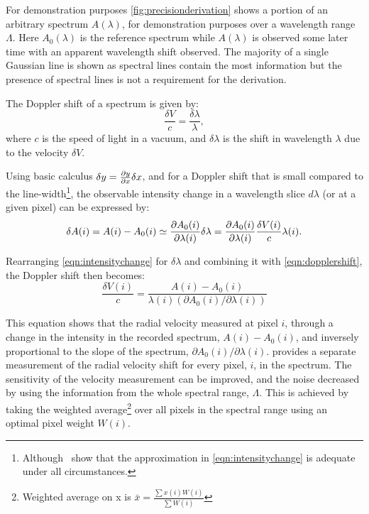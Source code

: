 For demonstration purposes \cref{fig:precisionderivation} shows a portion of an arbitrary spectrum \(A(\lambda)\), for demonstration purposes over a wavelength range \(\Lambda\).
Here \({A}_{0}(\lambda)\) is the reference spectrum while \(A(\lambda)\) is observed some later time with an apparent wavelength shift observed.
The majority of a single Gaussian line is shown as spectral lines contain the most information but the presence of spectral lines is not a requirement for the derivation.

The Doppler shift of a spectrum is given by:
\begin{equation}
\frac{\delta V}{c} = \frac{\delta \lambda}{\lambda},
\label{eqn:dopplershift}
\end{equation}
where \(c\) is the speed of light in a vacuum, and \(\delta \lambda\) is the shift in wavelength \(\lambda\) due to the velocity \(\delta V\).


Using basic calculus \(\delta y = \frac{\partial{y}}{\partial{x}} \delta x \nonumber\), and for a Doppler shift that is small compared to the line-width\footnote{Although~\citet{connes_absolute_1985} show that the approximation in \cref{eqn:intensitychange} is adequate under all circumstances.}, the observable intensity change in a wavelength slice \(d \lambda\) (or at a given pixel) can be expressed by:
\begin{equation}
\delta A(i) = A(i) - {A}_{0}(i) \simeq \frac{\partial{{A}_{0}(i)}}{\partial{\lambda(i)}} \delta \lambda = \frac{\partial{{A}_{0}(i)}}{\partial{\lambda(i)}} \frac{\delta V(i)}{c}\lambda(i).
\label{eqn:intensitychange}
\end{equation}

Rearranging \cref{eqn:intensitychange} for \(\delta \lambda\) and combining it with \cref{eqn:dopplershift}, the Doppler shift then becomes:
\begin{equation}
    \frac{\delta V(i)}{c} = \frac{A(i) - {A}_{0}(i) }{\lambda(i) (\partial {A}_{0}(i)/\partial \lambda(i))} \label{eqn:delta_v_i}
\end{equation}

This equation shows that the radial velocity measured at pixel {\(i\)}, through a change in the intensity in the recorded spectrum, \(A(i)-{A}_{0}(i)\), and inversely proportional to the slope of the spectrum, \({\partial {A}_{0}(i)}/{\partial \lambda(i)}\).
 provides a separate measurement of the radial velocity shift for every pixel, \(i\), in the spectrum.
The sensitivity of the velocity measurement can be improved, and the noise decreased by using the information from the whole spectral range, \(\Lambda\).
This is achieved by taking the weighted average\footnote{Weighted average on x is \(\bar{x} = \frac{\sum{ x(i)W(i)}}{\sum {W(i)}}\)} over all pixels in the spectral range using an optimal pixel weight \(W(i)\).

